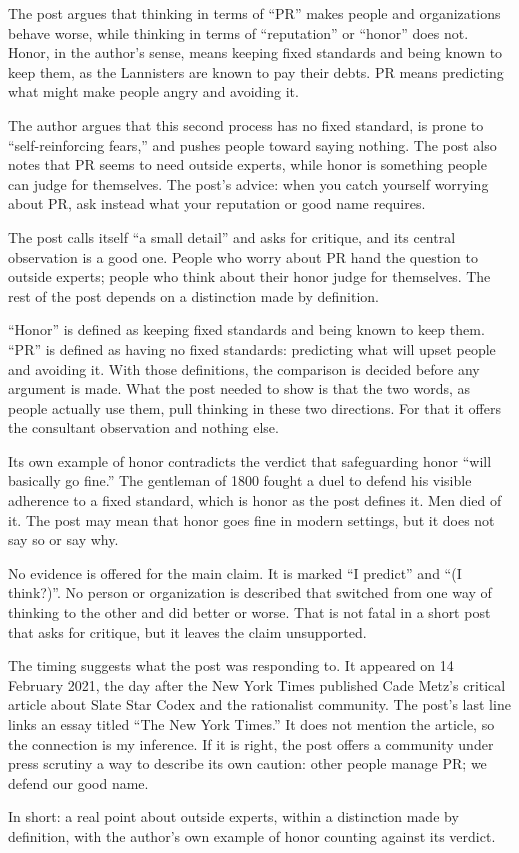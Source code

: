 \begin{afterword}
\summaryhead

The post argues that thinking in terms of ``PR'' makes people and organizations behave worse, while thinking in terms of ``reputation'' or ``honor'' does not. Honor, in the author's sense, means keeping fixed standards and being known to keep them, as the Lannisters are known to pay their debts. PR means predicting what might make people angry and avoiding it.

The author argues that this second process has no fixed standard, is prone to ``self-reinforcing fears,'' and pushes people toward saying nothing. The post also notes that PR seems to need outside experts, while honor is something people can judge for themselves. The post's advice: when you catch yourself worrying about PR, ask instead what your reputation or good name requires.

\responsehead

The post calls itself ``a small detail'' and asks for critique, and its central observation is a good one. People who worry about PR hand the question to outside experts; people who think about their honor judge for themselves. The rest of the post depends on a distinction made by definition.

``Honor'' is defined as keeping fixed standards and being known to keep them. ``PR'' is defined as having no fixed standards: predicting what will upset people and avoiding it. With those definitions, the comparison is decided before any argument is made. What the post needed to show is that the two words, as people actually use them, pull thinking in these two directions. For that it offers the consultant observation and nothing else.

Its own example of honor contradicts the verdict that safeguarding honor ``will basically go fine.'' The gentleman of 1800 fought a duel to defend his visible adherence to a fixed standard, which is honor as the post defines it. Men died of it. The post may mean that honor goes fine in modern settings, but it does not say so or say why.

No evidence is offered for the main claim. It is marked ``I predict'' and ``(I think?)''. No person or organization is described that switched from one way of thinking to the other and did better or worse. That is not fatal in a short post that asks for critique, but it leaves the claim unsupported.

The timing suggests what the post was responding to. It appeared on 14 February 2021, the day after the New York Times published Cade Metz's critical article about Slate Star Codex and the rationalist community. The post's last line links an essay titled ``The New York Times.'' It does not mention the article, so the connection is my inference. If it is right, the post offers a community under press scrutiny a way to describe its own caution: other people manage PR; we defend our good name.

In short: a real point about outside experts, within a distinction made by definition, with the author's own example of honor counting against its verdict.
\end{afterword}
